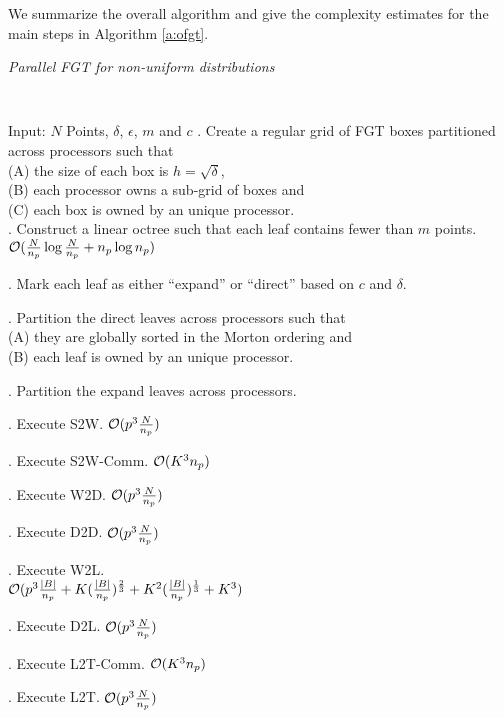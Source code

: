We summarize the overall algorithm and give the complexity estimates for the main steps in Algorithm \ref{a:ofgt}.  

\begin{algorithm}[!h]
\caption{ \label{a:ofgt}
\em Parallel FGT for non-uniform distributions}
{\tt
\begin{algorithmic}
\STATE Input: $N$ Points, $\delta$, $\epsilon$, $m$ and $c$
. Create a regular grid of FGT boxes partitioned across processors such that \\
 (A) the size of each box is $h = \sqrt{\delta}$, \\
 (B) each processor owns a sub-grid of boxes and \\
 (C) each box is owned by an unique processor. \\

. Construct a linear octree such that each leaf contains fewer than $m$ points. \\
\hfill $\mathcal{O}(\frac{N}{n_p} \log{\frac{N}{n_p}} + n_p \log{n_p})$

. Mark each leaf as either ``expand'' or ``direct'' based on $c$ and $\delta$.

. Partition the direct leaves across processors such that \\
  (A) they are globally sorted in the Morton ordering and \\
  (B) each leaf is owned by an unique processor.

. Partition the expand leaves across processors. 

. Execute S2W. \hfill $\mathcal{O}(p^3 \frac{N}{n_p})$

. Execute S2W-Comm. \hfill $\mathcal{O}(K^3 n_p)$

. Execute W2D. \hfill $\mathcal{O}(p^3 \frac{N}{n_p})$

. Execute D2D. \hfill $\mathcal{O}(p^3 \frac{N}{n_p})$

. Execute W2L. \\
 \hfill $\mathcal{O}(p^3 \frac{|B|}{n_p} + K (\frac{|B|}{n_p})^{\frac{2}{3}} + K^2(\frac{|B|}{n_p})^{\frac{1}{3}} + K^3 )$ 

. Execute D2L. \hfill $\mathcal{O}(p^3 \frac{N}{n_p})$

. Execute L2T-Comm. \hfill $\mathcal{O}(K^3 n_p)$

. Execute L2T. \hfill $\mathcal{O}( p^3\frac{N}{n_p})$
\end{algorithmic}
}
\end{algorithm}


